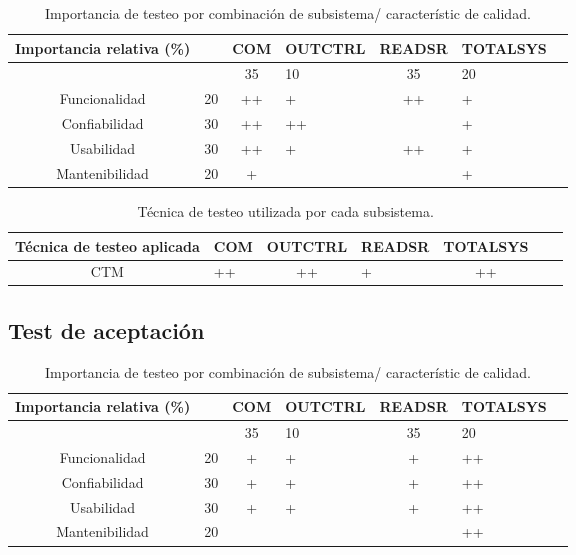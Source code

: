 \documentclass[12pt]{article}
\begin{document}
\begin{table}[ht]
    \centering
    \begin{tabularx}{\linewidth}{@{}|c|X|c|X|c|X|c|@{}}\hline \hline
    \rowcolor[HTML]{d6c6c3}
 Importancia relativa (\%)& &  COM & OUTCTRL & READSR & TOTALSYS\\
        \hline
       
            &  &35 & 10 &35 & 20                          \\
        Funcionalidad    & 20 & ++ & + & ++ & +		\\
        Confiabilidad    & 30 & ++ & ++ & & +                        \\
        Usabilidad       & 30 & ++ & + & ++ & +                        \\
        Mantenibilidad   & 20 & + & &  & +                        \\
        \hline
    \end{tabularx}
    \caption{Importancia de testeo por combinación de subsistema/ característic de calidad.}
\end{table}


\begin{table}[ht]
    \centering
    \begin{tabularx}{\linewidth}{@{}|c|X|c|X|c|X|c|@{}}\hline \hline
    \rowcolor[HTML]{d6c6c3}
 Técnica de testeo aplicada & COM & OUTCTRL & READSR & TOTALSYS\\
        \hline
      CTM & ++ &++ &+ & ++ \\
        \hline
    \end{tabularx}
    \caption{Técnica de testeo utilizada por cada subsistema.}
\end{table}

\subsection{Test de aceptación}

\begin{table}[ht]
    \centering
    \begin{tabularx}{\linewidth}{@{}|c|X|c|X|c|X|c|@{}}\hline \hline
    \rowcolor[HTML]{d6c6c3}
 Importancia relativa (\%)& &  COM & OUTCTRL & READSR & TOTALSYS\\
        \hline
       
            &  &35 & 10 &35 & 20                          \\
        Funcionalidad    & 20 & + & + & + & ++		\\
        Confiabilidad    & 30 & + & + & + & ++                        \\
        Usabilidad       & 30 & + & + & + & ++                        \\
        Mantenibilidad   & 20 &  & &  & ++                        \\
        \hline
    \end{tabularx}
    \caption{Importancia de testeo por combinación de subsistema/ característic de calidad.}
\end{table}
\end{document}
